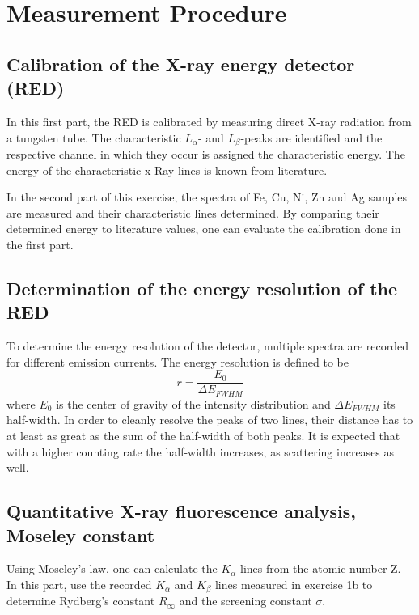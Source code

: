 \chapter{Measurement Procedure}
\section{ Calibration of the X-ray energy detector (RED)}

In this first part, the RED is calibrated by measuring direct X-ray radiation from a tungsten tube. The characteristic $L_\alpha$- and $L_\beta$-peaks are identified and the respective channel in which they occur  is assigned the characteristic energy. The energy of the characteristic x-Ray lines is known from literature. 

In the second part of this exercise, the spectra of Fe, Cu, Ni, Zn and Ag samples are measured and their characteristic lines determined. By comparing their determined energy to literature values, one can evaluate the calibration done in the first part.  
 
\section{Determination of the energy resolution of the RED}

To determine the energy resolution of the detector, multiple spectra are recorded for different emission currents. The energy resolution is defined to be 
$$ r = \frac{E_0}{\Delta E_{FWHM}}$$
where $E_0$ is the center of gravity of the intensity distribution and $\Delta E_{FWHM}$ its half-width.
In order to cleanly resolve the peaks of two lines, their distance has to at least as great as the sum of the half-width of both peaks. It is expected that with a higher counting rate the half-width increases, as scattering increases as well. 

\section{Quantitative X-ray fluorescence analysis, Moseley constant}
Using Moseley's law, one can calculate the $K_\alpha$ lines from the atomic number Z. In this part, use the recorded $K_\alpha$ and $K_\beta$ lines measured in exercise 1b to determine Rydberg's constant $R_\infty$ and the screening constant $\sigma$.
